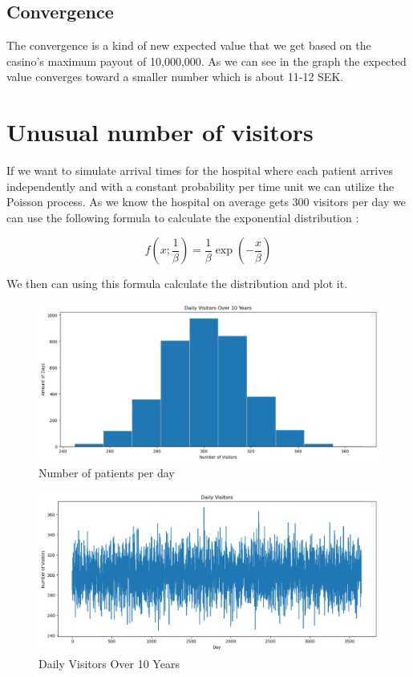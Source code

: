 \documentclass{article}
\begin{document}
\subsection{Convergence}
The convergence is a kind of new expected value that we get based on the casino's maximum payout of 10,000,000. As we can see in the graph the expected value converges toward a smaller number which is about 11-12 SEK.

\section{Unusual number of visitors}
If we want to simulate arrival times for the hospital where each patient arrives independently and with a constant probability per time unit we can utilize the Poisson process. As we know the hospital on average gets 300 visitors per day we can use the following formula to calculate the exponential distribution \cite{numpyran14:online}:


\[f(x; \frac{1}{\beta}) = \frac{1}{\beta} \exp\left(-\frac{x}{\beta}\right)\]

We then can using this formula calculate the distribution and plot it.

\begin{figure}[H]
    \centering
    \includegraphics[width=\textwidth]{HW9_2.png}
    \caption{Number of patients per day}
    \label{fig:graph}
\end{figure}

\begin{figure}[H]
    \centering
    \includegraphics[width=\textwidth]{HW9_3.png}
    \caption{Daily Visitors Over 10 Years}
    \label{fig:graph}
\end{figure}
\end{document}

